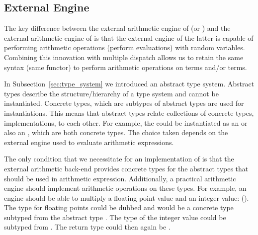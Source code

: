 






\subsection{External Engine}

The key difference between the external arithmetic engine of \prologsty (or \problogsty) and the external arithmetic engine of \dcproblogsty is that the external engine of the latter is capable of performing arithmetic operations (perform evaluations) with random variables. Combining this innovation with multiple dispatch allows us to retain the same syntax (same functor) to perform arithmetic operations on  terms and/or  terms.

In Subsection~\ref{sec:type_system} we introduced an abstract type system.
Abstract types describe the structure/hierarchy of a type system and cannot be instantiated. Concrete types, which are subtypes of abstract types are used for instantiations. This means that abstract types relate collections of concrete types, \ie implementations, to each other. For example, the   could be instantiated as an  or also an , which are both concrete types. The choice taken depends on the external engine used to evaluate arithmetic expressions. 

The only condition that we necessitate for an implementation of \dcproblogsty is that the external arithmetic back-end provides concrete types for the abstract types that should be used in arithmetic expression. Additionally, a practical arithmetic engine should implement arithmetic operations on these types. For example, an engine should be able to multiply a floating point value and an integer value: (). The type for floating points could be dubbed  and would be a concrete type subtyped from the abstract type . The type of the integer value could be  subtyped from . The return type could then again be .



